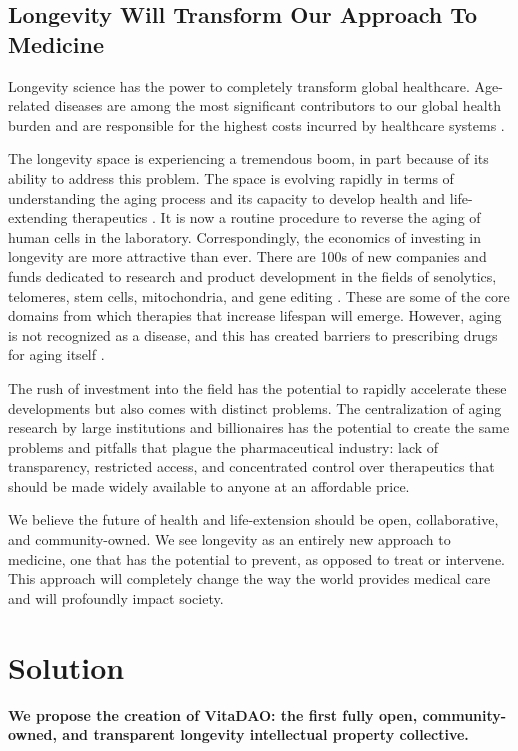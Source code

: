 \documentclass[12pt,letterpaper]{article}
\begin{document}
\subsection{Longevity Will Transform Our Approach To Medicine}
Longevity science has the power to completely transform global healthcare. Age-related diseases are among the most significant contributors to our global health burden and are responsible for the highest costs incurred by healthcare systems \citep{WHO2011}. 

The longevity space is experiencing a tremendous boom, in part because of its ability to address this problem. The space is evolving rapidly in terms of understanding the aging process and its capacity to develop health and life-extending therapeutics \citep{ARDD2020}. It is now a routine procedure to reverse the aging of human cells in the laboratory. Correspondingly, the economics of investing in longevity are more attractive than ever. There are 100s of new companies and funds dedicated to research and product development in the fields of senolytics, telomeres, stem cells, mitochondria, and gene editing \citep{Pfleger2021}. These are some of the core domains from which therapies that increase lifespan will emerge. However, aging is not recognized as a disease, and this has created barriers to prescribing drugs for aging itself \citep{Suresh2014}. 

The rush of investment into the field has the potential to rapidly accelerate these developments but also comes with distinct problems. The centralization of aging research by large institutions and billionaires has the potential to create the same problems and pitfalls that plague the pharmaceutical industry: lack of transparency, restricted access, and concentrated control over therapeutics that should be made widely available to anyone at an affordable price. 

We believe the future of health and life-extension should be open, collaborative, and community-owned. We see longevity as an entirely new approach to medicine, one that has the potential to prevent, as opposed to treat or intervene. This approach will completely change the way the world provides medical care and will profoundly impact society.

\section{Solution}
\textbf{We propose the creation of VitaDAO: the first fully open, community-owned, and transparent longevity intellectual property collective.}
\end{document}
